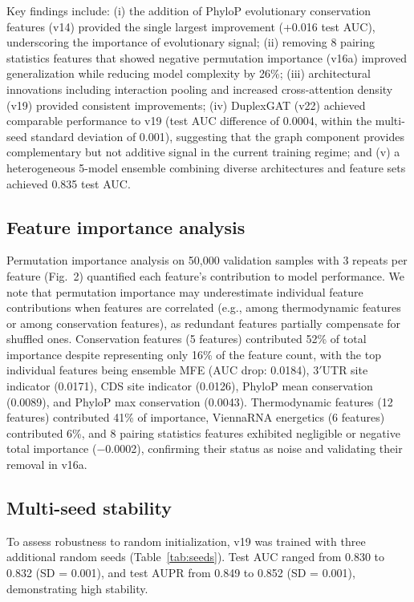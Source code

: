 \documentclass[sn-mathphys-num]{sn-jnl}
\begin{document}
Key findings include: (i) the addition of PhyloP evolutionary conservation features (v14) provided the single largest improvement (+0.016 test AUC), underscoring the importance of evolutionary signal; (ii) removing 8 pairing statistics features that showed negative permutation importance (v16a) improved generalization while reducing model complexity by 26\%; (iii) architectural innovations including interaction pooling and increased cross-attention density (v19) provided consistent improvements; (iv) DuplexGAT (v22) achieved comparable performance to v19 (test AUC difference of 0.0004, within the multi-seed standard deviation of 0.001), suggesting that the graph component provides complementary but not additive signal in the current training regime; and (v) a heterogeneous 5-model ensemble combining diverse architectures and feature sets achieved 0.835 test AUC.

\subsection{Feature importance analysis}

Permutation importance analysis on 50,000 validation samples with 3 repeats per feature (Fig.~2) quantified each feature's contribution to model performance. We note that permutation importance may underestimate individual feature contributions when features are correlated (e.g., among thermodynamic features or among conservation features), as redundant features partially compensate for shuffled ones. Conservation features (5 features) contributed 52\% of total importance despite representing only 16\% of the feature count, with the top individual features being ensemble MFE (AUC drop: 0.0184), 3$'$UTR site indicator (0.0171), CDS site indicator (0.0126), PhyloP mean conservation (0.0089), and PhyloP max conservation (0.0043). Thermodynamic features (12 features) contributed 41\% of importance, ViennaRNA energetics (6 features) contributed 6\%, and 8 pairing statistics features exhibited negligible or negative total importance ($-$0.0002), confirming their status as noise and validating their removal in v16a.

\subsection{Multi-seed stability}

To assess robustness to random initialization, v19 was trained with three additional random seeds (Table~\ref{tab:seeds}). Test AUC ranged from 0.830 to 0.832 (SD = 0.001), and test AUPR from 0.849 to 0.852 (SD = 0.001), demonstrating high stability.
\end{document}
